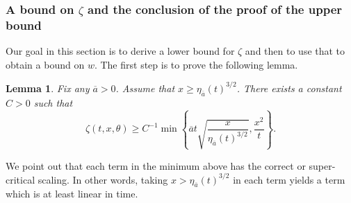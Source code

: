 \documentclass[11pt]{article}    %
\newtheorem{lemma}[theorem]{Lemma}
\begin{document}
\subsubsection*{A bound on $\zeta$ and the conclusion of the proof of the upper bound}

Our goal in this section is to derive a lower bound for $\zeta$ and then to use that to obtain a bound on $w$.  The first step is to prove the following lemma.
\begin{lemma}\label{lem:rho_bound}
Fix any $\overline a > 0$. Assume that $x \geq \eta_{\overline a}(t)^{3/2}$. There exists a constant $C>0$ such that
\[
	\zeta(t,x,\theta) \geq C^{-1}\min\left\{\overline a t\sqrt{ \frac{x}{\eta_{\overline a}(t)^{3/2}}}%
		,\frac{x^2}{t}\right\}.
\]
\end{lemma}
We point out that each term in the minimum above has the correct or super-critical scaling.  In other words, taking $x > \eta_{\overline a}(t)^{3/2}$ in each term yields a term which is at least linear in time.
\end{document}
